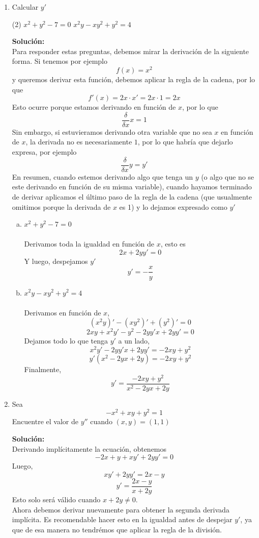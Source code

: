 \documentclass[12pt]{article}
\newenvironment{solucion}
{\begin{mdframed}[backgroundcolor=black!10]
		{\bf Solución:}\\
	}
	{
	\end{mdframed}
}
\newenvironment{preguntas}
{\begin{enumerate}\itemsep12pt
	}
	{
	\end{enumerate}
}
\begin{document}
\begin{preguntas}
\item Calcular $y'$
\begin{tasks}(2)
\task $x^2+y^2-7=0$
\task $x^2y-xy^2+y^2=4$
\end{tasks}
\begin{solucion}
Para responder estas preguntas, debemos mirar la derivación de la siguiente forma. Si tenemos por ejemplo 
$$f(x) = x^2$$
y queremos derivar esta función, debemos aplicar la regla de la cadena, por lo que
$$f'(x) = 2x \cdot x' = 2x \cdot 1 = 2x$$
Esto ocurre porque estamos derivando en función de $x$, por lo que $$\dfrac{\delta}{\delta x} x = 1$$
Sin embargo, si estuvieramos derivando otra variable que no sea $x$ en función de $x$, la derivada no es necesariamente $1$, por lo que habría que dejarlo expresa, por ejemplo
$$\dfrac{\delta}{\delta x} y = y'$$
En resumen, cuando estemos derivando algo que tenga un $y$ (o algo que no se este derivando en función de su misma variable), cuando hayamos terminado de derivar aplicamos el último paso de la regla de la cadena (que usualmente omitimos porque la derivada de $x$ es 1) y lo dejamos expresado como $y'$
\begin{enumerate}[a)]
\item $x^2+y^2-7=0$\\
\\
Derivamos toda la igualdad en función de $x$, esto es
$$2x + 2yy' = 0 $$
Y luego, despejamos $y'$
$$y' = -\dfrac{x}{y}$$
\item $x^2y-xy^2+y^2=4$\\
\\
Derivamos en función de $x$,
$$(x^2y)'-(xy^2)'+(y^2)'=0$$
$$2xy + x^2y'-y^2 - 2yy'x+2yy'=0$$
Dejamos todo lo que tenga $y'$ a un lado,
$$x^2y' - 2yy'x+2yy'= -2xy +y^2$$
$$y'(x^2 - 2yx+2y)= -2xy +y^2$$
Finalmente,
$$y'= \dfrac{-2xy +y^2}{x^2 - 2yx+2y}$$
\end{enumerate}
\end{solucion}
\item Sea
$$-x^2+xy+y^2=1$$
Encuentre el valor de $y''$ cuando $(x,y)=(1,1)$
\begin{solucion}
Derivando implícitamente la ecuación, obtenemos
$$-2x + y + xy' + 2yy' = 0$$
Luego,
$$xy' + 2yy' = 2x-y$$
$$y' = \dfrac{2x-y}{x+2y}$$
Esto solo será válido cuando $x+2y\neq 0$.\\

Ahora debemos derivar nuevamente para obtener la segunda derivada implícita. Es recomendable hacer esto en la igualdad antes de despejar $y'$, ya que de esa manera no tendrémos que aplicar la regla de la división. \\


\end{solucion}
\end{preguntas}
\end{document}
